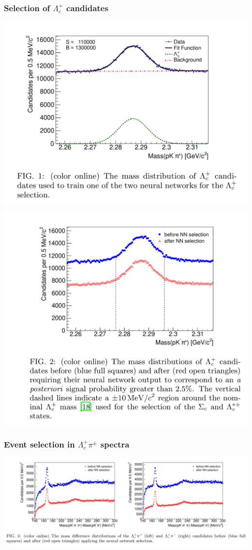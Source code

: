 \documentclass[10pt]{beamer}
\begin{document}
\begin{frame}[label=selection-Lc]%
  \frametitle{Selection of $\Lambda_c^+$ candidates}
  \centering
  \parbox{.48\textwidth}{
    \includegraphics[width=.48\textwidth]{figures/001/initial-Lc}
  } \parbox{.48\textwidth}{
    \includegraphics[width=.48\textwidth]{figures/001/after-Lc}
  }

\end{frame}%

\begin{frame}[label=selection-Sc*]%
  \frametitle{Event selection in $\Lambda_c^+\pi^\pm$ spectra}
  \centering
  \includegraphics[width=\textwidth]{figures/001/selection-Scstar}

\end{frame}%
\end{document}
